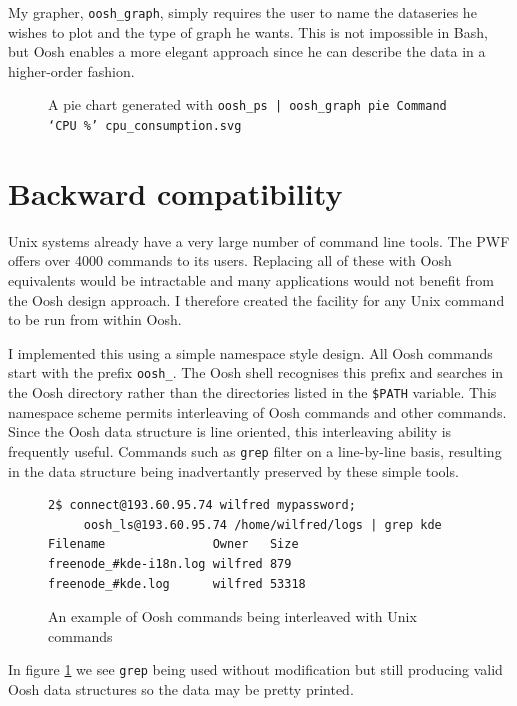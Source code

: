 \documentclass[12pt,twoside,notitlepage]{report}
\begin{document}
My grapher, {\tt oosh\_graph}, simply requires the user to name the
dataseries he wishes to plot and the type of graph he wants. This is
not impossible in Bash, but Oosh enables a more elegant approach since
he can describe the data in a higher-order fashion.

\begin{figure}[h]
  \caption{A pie chart generated with {\tt oosh\_ps | oosh\_graph pie Command `CPU \%' cpu\_consumption.svg}}
  \centering
\end{figure}

\section{Backward compatibility}

Unix systems already have a very large number of command line
tools. The PWF offers over 4000 commands to its users. Replacing all of these
with Oosh equivalents would be intractable and many applications would
not benefit from the Oosh design approach. I therefore created the
facility for any Unix command to be run from within Oosh. 

I implemented this using a simple namespace style design. All Oosh
commands start with the prefix {\tt oosh\_}. The Oosh shell recognises
this prefix and searches in the Oosh directory rather than the
directories listed in the {\tt \$PATH} variable. This namespace scheme
permits interleaving of Oosh commands and other commands. Since the
Oosh data structure is line oriented, this interleaving ability is
frequently useful. Commands such as {\tt grep} filter on a
line-by-line basis, resulting in the data structure being
inadvertantly preserved by these simple tools.

\begin{figure}[h]
\label{grepexample}
\caption{An example of Oosh commands being interleaved with Unix commands}
\begin{verbatim}
2$ connect@193.60.95.74 wilfred mypassword;
     oosh_ls@193.60.95.74 /home/wilfred/logs | grep kde
Filename               Owner   Size
freenode_#kde-i18n.log wilfred 879
freenode_#kde.log      wilfred 53318
\end{verbatim}
\end{figure}

In figure \ref{grepexample} we see {\tt grep} being used without
modification but still producing valid Oosh data structures so the
data may be pretty printed.
\end{document}
